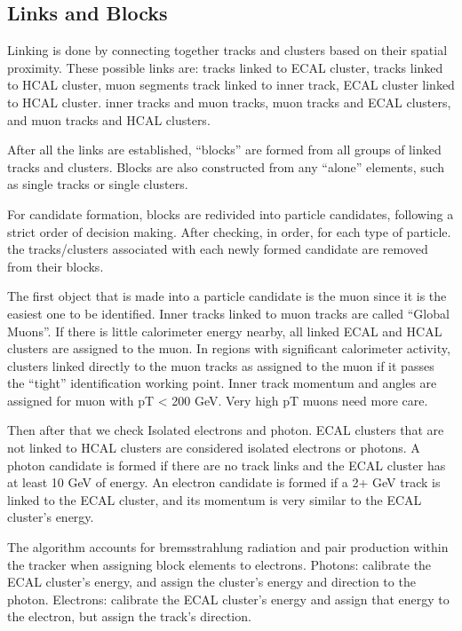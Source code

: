 \subsection{Links and Blocks}
Linking is done by connecting together tracks and clusters based on their spatial proximity. These possible links are: tracks linked to ECAL cluster, tracks linked to HCAL cluster, muon segments track linked to inner track, ECAL cluster linked to HCAL cluster. inner tracks and muon tracks, muon tracks and ECAL clusters, and muon tracks and HCAL clusters. 

After all the links are established, “blocks” are formed from all groups of linked tracks and clusters. Blocks are also constructed from any “alone” elements, such as single tracks or single clusters. 

For candidate formation, blocks are redivided into particle candidates, following a strict order of decision making. After checking, in order, for each type of particle. the tracks/clusters associated with each newly formed candidate are removed from their blocks.

The first object that is made into a particle candidate is the muon since it is the easiest one to be identified. Inner tracks linked to muon tracks are called “Global Muons”. If there is little calorimeter energy nearby, all linked ECAL and HCAL clusters are assigned to the muon. In regions with significant calorimeter activity, clusters linked directly to the muon tracks as assigned to the muon if it passes the “tight” identification working point. Inner track momentum and angles are assigned for muon with pT < 200 GeV. Very high pT muons need more care.  

Then after that we check Isolated electrons and photon. ECAL clusters that are not linked to HCAL clusters are considered isolated electrons or photons.  A photon candidate is formed if there are no track links and the ECAL cluster has at least 10 GeV of energy.  An electron candidate is formed if a 2+ GeV track is linked to the ECAL cluster, and its momentum is very similar to the ECAL cluster’s energy.   

The algorithm accounts for bremsstrahlung radiation and pair production within the tracker when assigning block elements to electrons. Photons: calibrate the ECAL cluster’s energy, and assign the cluster’s energy and direction to the photon. Electrons: calibrate the ECAL cluster’s energy and assign that energy to the electron, but assign the track’s direction. 

